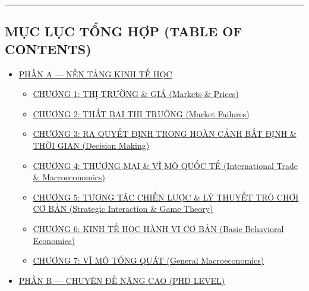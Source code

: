 \documentclass[
]{article}
\providecommand{\tightlist}{%
  \setlength{\itemsep}{0pt}\setlength{\parskip}{0pt}}
\begin{document}
\begin{center}\rule{0.5\linewidth}{0.5pt}\end{center}

\subsection{MỤC LỤC TỔNG HỢP (TABLE OF
CONTENTS)}\label{mux1ee5c-lux1ee5c-tux1ed5ng-hux1ee3p-table-of-contents}

\begin{itemize}
\tightlist
\item
  \hyperref[phux1ea7n-a--nux1ec1n-tux1ea3ng-kinh-tux1ebf-hux1ecdc]{PHẦN
  A --- NỀN TẢNG KINH TẾ HỌC}

  \begin{itemize}
  \tightlist
  \item
    \hyperref[chux1b0ux1a1ng-1-thux1ecb-trux1b0ux1eddng--giuxe1-markets--prices]{CHƯƠNG
    1: THỊ TRƯỜNG \& GIÁ (Markets \& Prices)}
  \item
    \hyperref[chux1b0ux1a1ng-2-thux1ea5t-bux1ea1i-thux1ecb-trux1b0ux1eddng-market-failures]{CHƯƠNG
    2: THẤT BẠI THỊ TRƯỜNG (Market Failures)}
  \item
    \hyperref[chux1b0ux1a1ng-3-ra-quyux1ebft-ux111ux1ecbnh-trong-houxe0n-cux1ea3nh-bux1ea5t-ux111ux1ecbnh--thux1eddi-gian-decision-making]{CHƯƠNG
    3: RA QUYẾT ĐỊNH TRONG HOÀN CẢNH BẤT ĐỊNH \& THỜI GIAN (Decision
    Making)}
  \item
    \hyperref[chux1b0ux1a1ng-4-thux1b0ux1a1ng-mux1ea1i--vux129-muxf4-quux1ed1c-tux1ebf-international-trade--macroeconomics]{CHƯƠNG
    4: THƯƠNG MẠI \& VĨ MÔ QUỐC TẾ (International Trade \&
    Macroeconomics)}
  \item
    \hyperref[chux1b0ux1a1ng-5-tux1b0ux1a1ng-tuxe1c-chiux1ebfn-lux1b0ux1ee3c--luxfd-thuyux1ebft-truxf2-chux1a1i-cux1a1-bux1ea3n-strategic-interaction--game-theory]{CHƯƠNG
    5: TƯƠNG TÁC CHIẾN LƯỢC \& LÝ THUYẾT TRÒ CHƠI CƠ BẢN (Strategic
    Interaction \& Game Theory)}
  \item
    \hyperref[chux1b0ux1a1ng-6-kinh-tux1ebf-hux1ecdc-huxe0nh-vi-cux1a1-bux1ea3n-basic-behavioral-economics]{CHƯƠNG
    6: KINH TẾ HỌC HÀNH VI CƠ BẢN (Basic Behavioral Economics)}
  \item
    \hyperref[chux1b0ux1a1ng-7-vux129-muxf4-tux1ed5ng-quuxe1t-general-macroeconomics]{CHƯƠNG
    7: VĨ MÔ TỔNG QUÁT (General Macroeconomics)}
  \end{itemize}
\item
  \hyperref[phux1ea7n-b--chuyuxean-ux111ux1ec1-nuxe2ng-cao-phd-level]{PHẦN
  B --- CHUYÊN ĐỀ NÂNG CAO (PHD LEVEL)}


\end{itemize}
\end{document}
